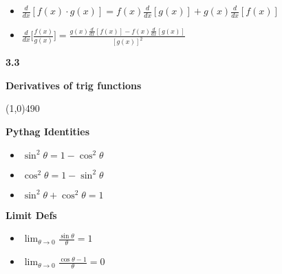 \documentclass{report}
\begin{document}
    \bigbreak \noindent 
    \begin{mdframed}
        \begin{itemize}
            \item $ \frac{d}{dx}[f(x) \cdot g(x)] = f(x) \frac{d}{dx}[g(x)] + g(x) \frac{d}{dx}[f(x)]$
            \item $ \frac{d}{dx}\bigg[ \frac{f(x)}{g(x)}\bigg] = \frac{g(x) \frac{d}{dx}[f(x)] - f(x) \frac{d}{dx}[g(x)]}{[g(x)]^2}$ 
        \end{itemize}
    \end{mdframed}

    \bigbreak \noindent 
    \begin{Large}
        \begin{mdframed}
            \begin{center}
                \textbf{3.3}
            \end{center}
        \end{mdframed}
    \end{Large}
    \begin{Large}
        \begin{center}
            \textbf{Derivatives of trig functions}
        \end{center}
    \end{Large}
    \line(1,0){490}
    
    \bigbreak \noindent 
    \begin{mdframed}
        \textbf{Pythag Identities}
        \begin{itemize}
            \item $\sin^{2}{\theta} = 1-\cos^{2}{\theta }$ 
            \item $\cos^{2}{\theta } = 1 - \sin^{2}{\theta}$
            \item $\sin^{2}{\theta} + \cos^{2}{\theta } =1$
        \end{itemize}
    \end{mdframed}
    \bigbreak \noindent 
    \begin{mdframed}
        \textbf{Limit Defs}
        \begin{itemize}
            \item $ \lim_{\theta \to 0}{\frac{\sin{\theta}}{\theta } = 1}$
            \item $\lim_{\theta  \to 0}{\frac{\cos{\theta } -1}{\theta }} = 0 $
        \end{itemize}
    \end{mdframed}
\end{document}
